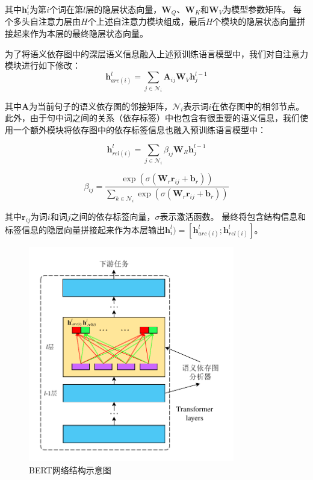 其中$\mathbf{h}_i^l$为第$i$个词在第$l$层的隐层状态向量，$\mathbf{W}_Q$、$\mathbf{W}_K$和$\mathbf{W}_V$为模型参数矩阵。
每个多头自注意力层由$H$个上述自注意力模块组成，最后$H$个模块的隐层状态向量拼接起来作为本层的最终隐层状态向量。

为了将语义依存图中的深层语义信息融入上述预训练语言模型中，我们对自注意力模块进行如下修改：
\begin{equation}
	\label{eq:att-gat-arc}
	\mathbf{h}_{arc(i)}^l = \sum_{j\in \mathcal{N}_i} \mathbf{A}_{ij}\mathbf{W}_V \mathbf{h}_j^{l-1}
\end{equation}

其中$\mathbf{A}$为当前句子的语义依存图的邻接矩阵，$\mathcal{N}_i$表示词$i$在依存图中的相邻节点。
此外，由于句中词之间的关系（依存标签）中也包含有很重要的语义信息，我们使用一个额外模块将依存图中的依存标签信息也融入预训练语言模型中：

\begin{equation}
	\label{eq:att-gat-rel}
	\mathbf{h}_{rel(i)}^l = \sum_{j\in \mathcal{N}_i} \beta_{ij}\mathbf{W}_R \mathbf{h}_j^{l-1}
\end{equation}

\begin{equation}
	\label{eq:att-gat-rel-weight}
	\beta_{ij} = \frac{\exp(\sigma(\mathbf{W}_r \mathbf{r}_{ij} + \mathbf{b}_r))}{\sum_{k\in\mathcal{N}_i}\exp(\sigma(\mathbf{W}_r \mathbf{r}_{ij} + \mathbf{b}_r))}
\end{equation}

其中$\mathbf{r}_{ij}$为词$i$和词$j$之间的依存标签向量，$\sigma$表示激活函数。
最终将包含结构信息和标签信息的隐层向量拼接起来作为本层输出$\mathbf{h}_i^l)=[\mathbf{h}_{arc(i)}^l;\mathbf{h}_{rel(i)}^l]$。

\begin{figure}[hbtp]
	\centering
	\vspace{-1em}
	\includegraphics[width=90mm]{figures/att-gat.pdf}
	\vspace{-1.5em}
	\caption{BERT网络结构示意图}
	\label{fig:att-gat}
\end{figure}

